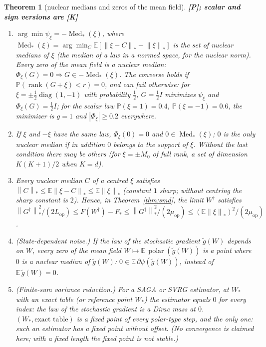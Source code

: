 \documentclass[11pt]{article}
\newtheorem{theorem}{Theorem}[section]
\theoremstyle{definition}
\theoremstyle{remark}
\newcommand{\E}{\mathbb{E}}
\newcommand{\Prob}{\mathbb{P}}
\newcommand{\nnuc}[1]{\left\|#1\right\|_{*}}
\newcommand{\abs}[1]{\left|#1\right|}
\newcommand{\diag}{\operatorname{diag}}
\newcommand{\polar}{\operatorname{polar}}
\newcommand{\Med}{\operatorname{Med}_\ast}
\newcommand{\Lop}{L_{\mathrm{op}}}
\newcommand{\muop}{\mu_{\mathrm{op}}}
\begin{document}
\begin{theorem}[nuclear medians and zeros of the mean field]\label{thm:median} \textbf{[P]; scalar and sign versions are [K]}
\begin{enumerate}[label=(\alph*)]
\item $\arg\min\psi_\xi=-\Med(\xi)$, where $\Med(\xi)=\arg\min_C\E[\nnuc{\xi-C}-\nnuc\xi]$ is the set of \emph{nuclear
medians} of $\xi$ (the median of a law in a normed space, for the nuclear norm). Every zero of the mean field is a
nuclear median: $\Phi_\xi(G)=0\Rightarrow G\in-\Med(\xi)$. The converse holds if $\Prob(\operatorname{rank}(G+\xi)<r)=0$,
and can fail otherwise: for $\xi=\pm\frac12\diag(1,-1)$ with probability $\frac12$, $G=\frac12I$ minimizes $\psi_\xi$ and
$\Phi_\xi(G)=\frac12I$; for the scalar law $\Prob(\xi=1)=0.4$, $\Prob(\xi=-1)=0.6$, the minimizer is $g=1$ and
$\abs{\Phi_\xi}\ge0.2$ everywhere.
\item If $\xi$ and $-\xi$ have the same law, $\Phi_\xi(0)=0$ and $0\in\Med(\xi)$; $0$ is the only nuclear median if in
addition $0$ belongs to the support of $\xi$. Without the last condition there may be others (for $\xi=\pm M_0$ of full
rank, a set of dimension $K(K+1)/2$ when $K=d$).
\item Every nuclear median $C$ of a centred $\xi$ satisfies $\nnuc C\le\E\nnuc{\xi-C}\le\E\nnuc\xi$ (constant $1$ sharp;
without centring the sharp constant is $2$). Hence, in Theorem~\ref{thm:smd}, the limit $W^\dagger$ satisfies
$\nnuc{G^\dagger}^2/(2\Lop)\le F(W^\dagger)-F_\ast\le\nnuc{G^\dagger}^2/(2\muop)\le(\E\nnuc\xi)^2/(2\muop)$.
\item (State-dependent noise.) If the law of the stochastic gradient $\tilde g(W)$ depends on $W$, every zero of the mean
field $W\mapsto\E\,\polar(\tilde g(W))$ is a point where $0$ is a nuclear median of $\tilde g(W)$:
$0\in\E\,\partial\psi(\tilde g(W))$, instead of $\E\,\tilde g(W)=0$.
\item (Finite-sum variance reduction.) For a SAGA or SVRG estimator, at $W_\ast$ with an exact table (or reference
point $W_\ast$) the estimator equals $0$ for every index: the law of the stochastic gradient is a Dirac mass at $0$.
$(W_\ast,\text{exact table})$ is a fixed point of every polar-type step, and the only one: such an estimator has a
fixed point without offset. (No convergence is claimed here; with a fixed length the fixed point is not stable.)
\end{enumerate}
\end{theorem}
\end{document}
